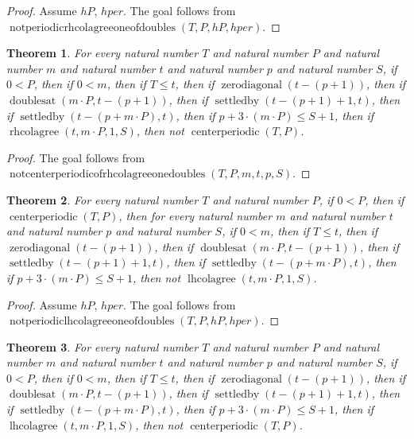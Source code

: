 \documentclass[11pt]{article}
\newtheorem{theorem}{Theorem}[section]
\theoremstyle{definition}
\begin{document}
\begin{proof}
Assume \(hP\), \(hper\).
The goal follows from \(\operatorname{notperiodicrhcolagreeoneofdoubles}(T, P, hP, hper)\).
\end{proof}
\begin{theorem}
\label{ll:paper:not-centerperiodic-of-rhcolagree-one-doubles}
For every natural number \(T\) and natural number \(P\) and natural number \(m\) and natural number \(t\) and natural number \(p\) and natural number \(S\), if \(0 < P\), then if \(0 < m\), then if \(T \le t\), then if \(\operatorname{zerodiagonal}(t - (p + 1))\), then if \(\operatorname{doublesat}(m \cdot P, t - (p + 1))\), then if \(\operatorname{settledby}(t - (p + 1) + 1, t)\), then if \(\operatorname{settledby}(t - (p + m \cdot P), t)\), then if \(p + 3 \cdot (m \cdot P) \le S + 1\), then if \(\operatorname{rhcolagree}(t, m \cdot P, 1, S)\), then not \(\operatorname{centerperiodic}(T, P)\).
\end{theorem}
\begin{proof}
The goal follows from \(\operatorname{notcenterperiodicofrhcolagreeonedoubles}(T, P, m, t, p, S)\).
\end{proof}
\begin{theorem}
\label{ll:paper:not-periodic-lhcolagree-one-of-doubles}
For every natural number \(T\) and natural number \(P\), if \(0 < P\), then if \(\operatorname{centerperiodic}(T, P)\), then for every natural number \(m\) and natural number \(t\) and natural number \(p\) and natural number \(S\), if \(0 < m\), then if \(T \le t\), then if \(\operatorname{zerodiagonal}(t - (p + 1))\), then if \(\operatorname{doublesat}(m \cdot P, t - (p + 1))\), then if \(\operatorname{settledby}(t - (p + 1) + 1, t)\), then if \(\operatorname{settledby}(t - (p + m \cdot P), t)\), then if \(p + 3 \cdot (m \cdot P) \le S + 1\), then not \(\operatorname{lhcolagree}(t, m \cdot P, 1, S)\).
\end{theorem}
\begin{proof}
Assume \(hP\), \(hper\).
The goal follows from \(\operatorname{notperiodiclhcolagreeoneofdoubles}(T, P, hP, hper)\).
\end{proof}
\begin{theorem}
\label{ll:paper:not-centerperiodic-of-lhcolagree-one-doubles}
For every natural number \(T\) and natural number \(P\) and natural number \(m\) and natural number \(t\) and natural number \(p\) and natural number \(S\), if \(0 < P\), then if \(0 < m\), then if \(T \le t\), then if \(\operatorname{zerodiagonal}(t - (p + 1))\), then if \(\operatorname{doublesat}(m \cdot P, t - (p + 1))\), then if \(\operatorname{settledby}(t - (p + 1) + 1, t)\), then if \(\operatorname{settledby}(t - (p + m \cdot P), t)\), then if \(p + 3 \cdot (m \cdot P) \le S + 1\), then if \(\operatorname{lhcolagree}(t, m \cdot P, 1, S)\), then not \(\operatorname{centerperiodic}(T, P)\).
\end{theorem}
\end{document}
